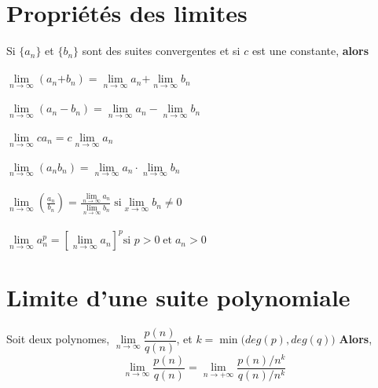 \documentclass{report}
\begin{document}
\begin{multicols*}{3}
 

    \section{Propriétés des limites}
        Si $\{a_n\}$ et $\{b_n\}$ sont des suites convergentes et 
        si $c$ est une constante, \textbf{alors} \\\\ 
        $\lim\limits_{n\to\infty  }\left(a_n \text{+} b_n \right) = 
        \lim\limits_{n\to\infty  }a_n \text{+} 
        \lim\limits_{n\to\infty  }b_n$
        \\\\
        $\lim\limits_{n\to\infty  }\left(a_n - b_n \right) = 
        \lim\limits_{n\to\infty  }a_n - \lim\limits_{n\to\infty  }b_n$ 
        \\\\
        $\lim\limits_{n\to\infty  }ca_n = c \lim\limits_{n \to \infty  }a_n$ 
        \\\\
        $\lim\limits_{n\to\infty  }\left(a_nb_n \right) = 
        \lim\limits_{n\to\infty  }a_n \cdot \lim\limits_{n\to\infty  }b_n$
        \\\\
        $\lim\limits_{n\to\infty  }\left(\frac{a_n}{b_n} \right) = 
        \frac{\lim\limits_{n\to\infty  }a_n}{\lim\limits_{n\to\infty  }b_n}
        \;
        \text{si} \lim\limits_{x\to\infty  }b_n \neq 0$
        \\\\
        $\lim\limits_{n\to\infty  }a_n^{p} = 
        \left[\lim\limits_{n\to\infty  }a_n \right]^p \text{si } 
        p > 0 \; \text{et} \; a_n > 0$



    \section{Limite d'une suite polynomiale} 
        Soit deux polynomes,
        $\lim\limits_{n\to \infty } \dfrac{p(n)}{q(n)}$, 
        et 
        $k = \min\bigl(deg(p), deg(q)\bigr)$
        \textbf{Alors},   
        \[ \lim\limits_{n\to \infty } \dfrac{p(n)}{q(n)} =
        \lim\limits_{n\to+\infty}\dfrac{p(n)/{n^k}}{q(n)/n^{k}} \]




\end{multicols*}
\end{document}
